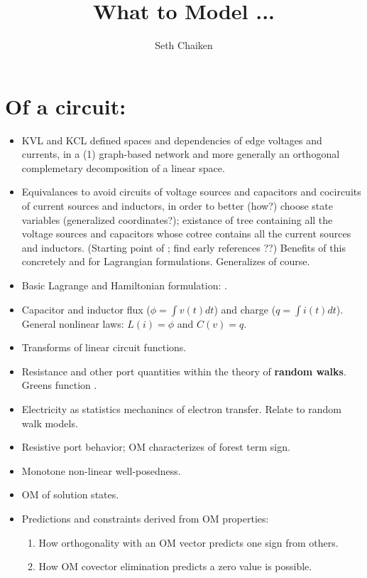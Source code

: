 \documentclass{article}
\title{What to Model ... }
\author{Seth Chaiken}
\begin{document}
\maketitle

\section{Of a circuit:}
\begin{itemize}
\item KVL and KCL defined spaces and dependencies of edge voltages and currents,
in a (1) graph-based network and more generally an orthogonal complemetary
decomposition of a linear space.
\item Equivalances to avoid circuits of voltage sources and capacitors
and cocircuits of current sources and inductors, in order to better (how?)
choose state variables (generalized coordinates?); existance of tree containing
all the voltage sources and capacitors whose cotree contains all the 
current sources and inductors.    (Starting point
of \cite{ChuaMcPhersonLagrange}; find early references ??)
Benefits of this concretely and for Lagrangian formulations.
Generalizes of course.
\item Basic Lagrange and Hamiltonian formulation: 
\cite{ChuaMcPhersonLagrange}.
\item Capacitor and inductor flux ($\phi = \int v(t) dt$) and
charge ($q = \int i(t) dt$).
General nonlinear laws: $L(i) = \phi$ and $C(v) = q$.
\item Transforms of linear circuit functions.
\item Resistance and other port quantities within the theory of 
\textbf{random walks}\cite{DoyleSnellRandom,ProbOnTreesNetworks}.
Greens function \cite{ChungYaoDiscreteGreensFn}.
\item Electricity as statistics mechanincs of electron transfer.  Relate to 
random walk models.
\item Resistive port behavior; OM characterizes of 
forest term sign.
\item Monotone non-linear well-posedness.
\item OM of solution states.
\item Predictions and constraints derived from OM properties:
\begin{enumerate}
\item How orthogonality with an OM vector predicts one sign from others.
\item How OM covector elimination predicts a zero value is possible.

\end{enumerate}
\end{itemize}
\end{document}
